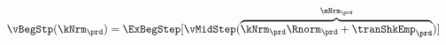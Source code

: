   \begin{equation}\begin{gathered}\begin{aligned}
        \vBegStp(\kNrm_{\prd}) & = \ExBegStep[\vMidStep(\overbrace{\kNrm_{\prd} \Rnorm_{\prd} + \tranShkEmp_{\prd}}^{\mNrm_{\prd}})]  \label{eq:vBegStp}
      \end{aligned}\end{gathered}\end{equation}
